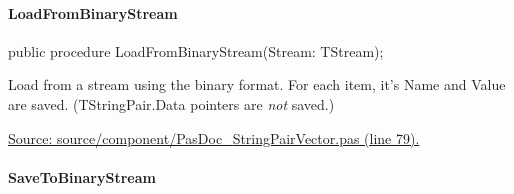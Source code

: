 \documentclass{report}
\newif\ifpdf
\begin{document}
\paragraph*{LoadFromBinaryStream}\hspace*{\fill}

\label{PasDoc_StringPairVector.TStringPairVector-LoadFromBinaryStream}
\begin{list}{}{
\setlength{\itemindent}{0cm}
\setlength{\listparindent}{0cm}
\setlength{\leftmargin}{\evensidemargin}
\addtolength{\leftmargin}{\tmplength}
\settowidth{\labelsep}{X}
\addtolength{\leftmargin}{\labelsep}
\setlength{\labelwidth}{\tmplength}
}
\item[\textbf{Declaration}\hfill]
\ifpdf
\begin{flushleft}
\fi
\begin{ttfamily}
public procedure LoadFromBinaryStream(Stream: TStream);\end{ttfamily}

\ifpdf
\end{flushleft}
\fi

\par
\item[\textbf{Description}]
Load from a stream using the binary format. For each item, it's Name and Value are saved. (TStringPair.Data pointers are \textit{not} saved.)\par
\href{https://github.com/pasdoc/pasdoc/blob/master/source/component/PasDoc_StringPairVector.pas#L79}{Source: source/component/PasDoc{\_}StringPairVector.pas (line 79).}

\end{list}
\paragraph*{SaveToBinaryStream}\hspace*{\fill}
\end{document}
